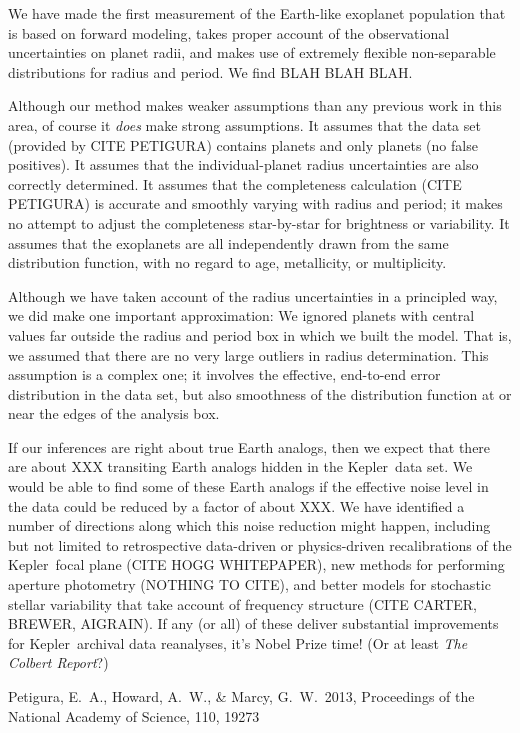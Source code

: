 \documentclass[12pt,preprint]{aastex}
\newcommand{\project}[1]{{\sffamily #1}}
\newcommand{\kepler}{\project{Kepler}}
\newcommand{\foreign}[1]{\emph{#1}}
\newcommand{\etal}{\foreign{et\,al.}}
\begin{document}
We have made the first measurement of the Earth-like exoplanet population
  that is based on forward modeling,
  takes proper account of the observational uncertainties on planet radii,
  and makes use of extremely flexible non-separable distributions for radius and period.
We find BLAH BLAH BLAH.

Although our method makes weaker assumptions than any previous work in this area,
  of course it \emph{does} make strong assumptions.
It assumes that the data set (provided by CITE PETIGURA)
  contains planets and only planets (no false positives).
It assumes that the individual-planet radius uncertainties
  are also correctly determined.
It assumes that the completeness calculation (CITE PETIGURA)
  is accurate and smoothly varying with radius and period;
  it makes no attempt to adjust the completeness star-by-star for brightness or variability.
It assumes that the exoplanets are all independently drawn from the same distribution function,
  with no regard to age, metallicity, or multiplicity.

Although we have taken account of the radius uncertainties in a principled way,
  we did make one important approximation:
We ignored planets with central values far outside the radius and period box in which we built the model.
That is, we assumed that there are no very large outliers in radius determination.
This assumption is a complex one;
  it involves the effective, end-to-end error distribution in the data set,
  but also smoothness of the distribution function at or near the edges of the analysis box.

If our inferences are right about true Earth analogs,
  then we expect that there are about XXX transiting Earth analogs
  hidden in the \kepler\ data set.
We would be able to find some of these Earth analogs if the effective noise level in the data could be reduced
  by a factor of about XXX.
We have identified a number of directions along which this noise reduction might happen,
  including but not limited to
  retrospective data-driven or physics-driven recalibrations of the \kepler\ focal plane (CITE HOGG WHITEPAPER),
  new methods for performing aperture photometry (NOTHING TO CITE),
  and better models for stochastic stellar variability that take account of frequency structure (CITE CARTER, BREWER, AIGRAIN).
If any (or all) of these deliver substantial improvements for \kepler\ archival data reanalyses,
  it's Nobel Prize time!  (Or at least \textsl{The Colbert Report}?)

\newcommand{\arxiv}[1]{\href{http://arxiv.org/abs/#1}{arXiv:#1}}
\begin{thebibliography}{}\raggedright

\bibitem[Petigura \etal(2013)]{petigura}
Petigura, E.~A., Howard, A.~W., \& Marcy, G.~W.\ 2013,
Proceedings of the National Academy of Science, 110, 19273

\end{thebibliography}
\end{document}
